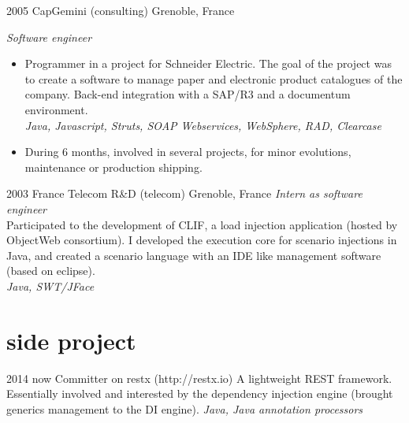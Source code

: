 \documentclass[]{k-cv} %
\begin{document}
\clearpage


\begin{entrylist}

\entry
{2005 }
{CapGemini (consulting)}
{Grenoble, France}
{\emph{Software engineer}
\begin{itemize}
\item
Programmer in a project for Schneider Electric.
The goal of the project was to create a software to manage paper and electronic product
catalogues of the company.
Back-end integration with a SAP/R3 and a documentum environment. \\
\emph{Java, Javascript, Struts, SOAP Webservices, WebSphere, RAD, Clearcase}
\item
During 6 months, involved in several projects, for minor evolutions, maintenance or production shipping.
\end{itemize}}
\entry
{2003 }
{France Telecom R\&D (telecom)}
{Grenoble, France}
{\emph{Intern as software engineer} \\
Participated to the development of CLIF,
a load injection application (hosted by ObjectWeb consortium).
I developed the execution core for scenario injections in Java,
and created a scenario language with an IDE like management software (based on eclipse). \\
\emph{Java, SWT/JFace}}
\end{entrylist}




\section{side project}

\begin{entrylist}
\entry
{2014 \to now}
{Committer on restx (http://restx.io)}
{}
{A lightweight REST framework.
Essentially involved and interested by the dependency injection engine (brought generics management to the DI engine).
\emph{Java, Java annotation processors}}
\end{entrylist}
\end{document}
